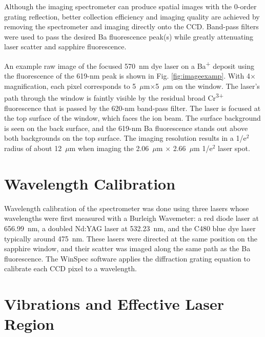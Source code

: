 Although the imaging spectrometer can produce spatial images with the 0-order grating reflection, better collection efficiency and imaging quality are achieved by removing the spectrometer and imaging directly onto the CCD.  Band-pass filters were used to pass the desired Ba fluorescence peak(s) while greatly attenuating laser scatter and sapphire fluorescence.

An example raw image of the focused 570~nm dye laser on a Ba\textsuperscript{+} deposit using the fluorescence of the 619-nm peak is shown in Fig. \ref{fig:imageexamp}.  With 4$\times$ magnification, each pixel corresponds to 5~$\mu$m$\times$5~$\mu$m on the window.  The laser's path through the window is faintly visible by the residual broad Cr\textsuperscript{3+} fluorescence that is passed by the 620-nm band-pass filter.  The laser is focused at the top surface of the window, which faces the ion beam.  The surface background is seen on the back surface, and the 619-nm Ba fluorescence stands out above both backgrounds on the top surface.  The imaging resolution results in a 1/e$^{2}$ radius of about 12~$\mu$m when imaging the 2.06~$\mu$m $\times$ 2.66~$\mu$m 1/e$^{2}$ laser spot.

\section{Wavelength Calibration}

Wavelength calibration of the spectrometer was done using three lasers whose wavelengths were first measured with a Burleigh Wavemeter:  a red diode laser at 656.99~nm, a doubled Nd:YAG laser at 532.23~nm, and the C480 blue dye laser typically around 475~nm.  These lasers were directed at the same position on the sapphire window, and their scatter was imaged along the same path as the Ba fluorescence.  The WinSpec software applies the diffraction grating equation to calibrate each CCD pixel to a wavelength.

\section{Vibrations and Effective Laser Region}
\label{sec:vibes}

